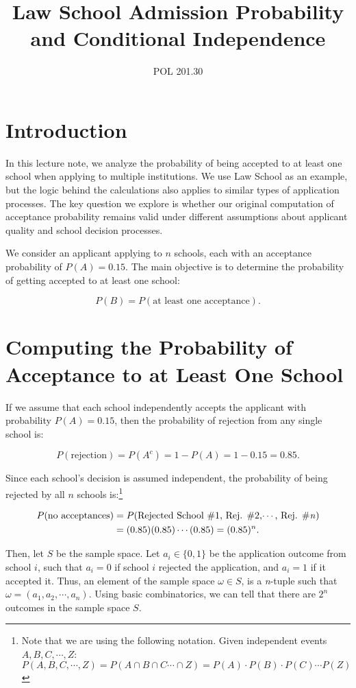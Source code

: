 \documentclass{article}
\title{Law School Admission Probability and Conditional Independence}
\author{POL 201.30}
\date{}
\begin{document}
\maketitle

\section{Introduction}

In this lecture note, we analyze the probability of being accepted to at least one school when applying to multiple institutions. We use Law School as an example, but the logic behind the calculations also applies to similar types of application processes. The key question we explore is whether our original computation of acceptance probability remains valid under different assumptions about applicant quality and school decision processes.

We consider an applicant applying to \( n \)  schools, each with an acceptance probability of \( P(A) = 0.15 \). The main objective is to determine the probability of getting accepted to at least one school:

\[
P(B) = P(\text{at least one acceptance}).
\]

\section{Computing the Probability of Acceptance to at Least One School}

If we assume that each school independently accepts the applicant with probability \( P(A) = 0.15 \), then the probability of rejection from any single school is:

\[
P(\text{rejection}) = P(A^c) = 1 - P(A) = 1 - 0.15 = 0.85.
\]

Since each school's decision is assumed independent, the probability of being rejected by all \( n \) schools is:\footnote{Note that we are using the following notation. Given independent events $A,B, C, \cdots, Z$: $P(A,B,C, \cdots , Z) = P(A \cap B \cap C \cdots \cap Z) = P(A) \cdot P(B) \cdot P(C) \cdots P(Z)$}

\begin{align*}
P(\text{no acceptances}) &= P(\text{Rejected School \#1, Rej. \#2,$\cdots$, Rej. \#\emph{n}} ) \\
 &= (0.85) (0.85) \cdots (0.85) = (0.85)^n.
\end{align*}

Then, let $S$ be the sample space. Let $a_i\in \{0,1\}$ be the application outcome from school $i$, such that $a_i=0$ if school $i$ rejected the application, and $a_i=1$ if it accepted it. Thus, an element of the sample space $\omega \in S$, is a \emph{n}-tuple such that $\omega = (a_1, a_2, \cdots, a_n)$. Using basic combinatorics, we can tell that there are $2^n$ outcomes in the sample space $S$. 
\end{document}
